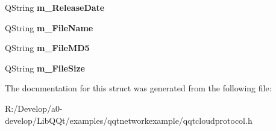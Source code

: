 \begin{DoxyCompactItemize}
Q\+String {\bfseries m\+\_\+\+Release\+Date}
\item 
\mbox{\label{structtag_q_t_check_version_result_a1ab3568e78ee794997e676e333ce70f0}} 
Q\+String {\bfseries m\+\_\+\+File\+Name}
\item 
\mbox{\label{structtag_q_t_check_version_result_a98c6523d49f8a3f91e177ce5429333a6}} 
Q\+String {\bfseries m\+\_\+\+File\+M\+D5}
\item 
\mbox{\label{structtag_q_t_check_version_result_abdd0f731bdb09b10100fd3424f3fad78}} 
Q\+String {\bfseries m\+\_\+\+File\+Size}
\end{DoxyCompactItemize}


The documentation for this struct was generated from the following file\+:\begin{DoxyCompactItemize}
\item 
R\+:/\+Develop/a0-\/develop/\+Lib\+Q\+Qt/examples/qqtnetworkexample/qqtcloudprotocol.\+h\end{DoxyCompactItemize}
